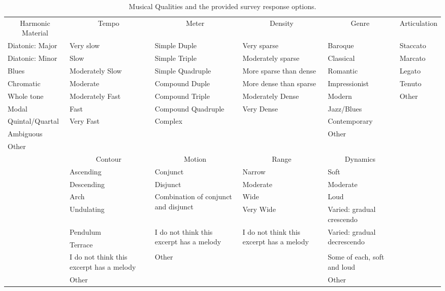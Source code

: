 \documentclass[
  english,
  man,floatsintext]{apa6}
\makeatletter
\newenvironment{lltable}{\begin{landscape}\begin{center}\begin{ThreePartTable}}{\end{ThreePartTable}\end{center}\end{landscape}}
\newcommand\LastLTentrywidth{1em}
\newlength\longtablewidth
\newcommand{\getlongtablewidth}{\begingroup \ifcsname LT@\roman{LT@tables}\endcsname \global\longtablewidth=0pt \renewcommand{\LT@entry}[2]{\global\advance\longtablewidth by ##2\relax\gdef\LastLTentrywidth{##2}}\@nameuse{LT@\roman{LT@tables}} \fi \endgroup}
\makeatother
\begin{document}
\begin{lltable}
\begin{scriptsize}
\begin{longtable}{p{}p{}p{}p{}p{}p{}}\noalign{\getlongtablewidth\global\LTcapwidth=\longtablewidth}
\caption{\label{tab:qualitiestable}Musical Qualities and the provided survey response options.}\\
\toprule[.8pt]
 \multicolumn{1}{c}{Harmonic Material} & \multicolumn{1}{c}{Tempo} & \multicolumn{1}{c}{Meter} & \multicolumn{1}{c}{Density} & \multicolumn{1}{c}{Genre} & \multicolumn{1}{c}{Articulation}\\
 \midrule
      Diatonic: Major & Very slow & Simple Duple & Very sparse & Baroque & Staccato \\
      Diatonic: Minor & Slow & Simple Triple & Moderately sparse & Classical & Marcato \\
      Blues & Moderately Slow & Simple Quadruple  & More sparse than dense & Romantic & Legato\\
      Chromatic & Moderate & Compound Duple & More dense than sparse & Impressionist & Tenuto\\
      Whole tone & Moderately Fast & Compound Triple & Moderately Dense & Modern & Other \\       
      Modal  & Fast & Compound Quadruple & Very Dense & Jazz/Blues & \\
      Quintal/Quartal  & Very Fast & Complex & & Contemporary & \\
      Ambiguous  & & & & Other & \\
      Other  & & & & & \\
\bottomrule\addlinespace[.5em]
 & \multicolumn{1}{c}{Contour} & \multicolumn{1}{c}{Motion} & \multicolumn{1}{c}{Range} & \multicolumn{1}{c}{Dynamics} & \\
 \cmidrule[.5pt]{2-5}
  & Ascending & Conjunct & Narrow & Soft & \\
  & Descending & Disjunct & Moderate & Moderate  & \\
  & Arch & \multirow{2}{0.2\textwidth}{Combination of conjunct and disjunct} & Wide & Loud  & \\
  & Undulating &  & Very Wide & Varied: gradual crescendo &\\
  & Pendulum & \multirow{2}{0.2\textwidth}{I do not think this excerpt has a melody} & \multirow{2}{0.2\textwidth}{I do not think this excerpt has a melody} & \multirow{2}{0.2\textwidth}{Varied: gradual decrescendo} &\\
  & Terrace & & & & \\
  & \multirow{2}{0.2\textwidth}{I do not think this excerpt has a melody} & Other & & \multirow{2}{0.2\textwidth}{Some of each, soft and loud}  &\\
  & & & & & \\
  & Other & & & Other & \\
  
\cmidrule[.75pt]{2-5}
\end{longtable}
\end{scriptsize}
\end{lltable}
\end{document}
